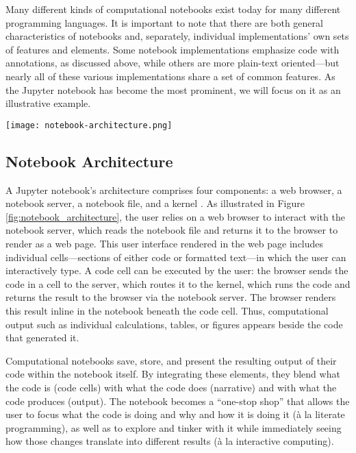 \documentclass[11pt,letterpaper]{article}
\begin{document}
Many different kinds of computational notebooks exist today for many different programming languages. It is important to note that there are both general characteristics of notebooks and, separately, individual implementations' own sets of features and elements. Some notebook implementations emphasize code with annotations, as discussed above, while others are more plain-text oriented---but nearly all of these various implementations share a set of common features. As the Jupyter notebook has become the most prominent, we will focus on it as an illustrative example.

\begin{figure*}[tbp]
	\centering
	\texttt{[image: notebook-architecture.png]}
	\caption{Architecture of the Jupyter notebook computing environment.}
	\label{fig:notebook_architecture}
\end{figure*}

\subsection{Notebook Architecture}

A Jupyter notebook's architecture comprises four components: a web browser, a notebook server, a notebook file, and a kernel \citep{kluyver_jupyter_2016}. As illustrated in Figure \ref{fig:notebook_architecture}, the user relies on a web browser to interact with the notebook server, which reads the notebook file and returns it to the browser to render as a web page. This user interface rendered in the web page includes individual cells---sections of either code or formatted text---in which the user can interactively type. A code cell can be executed by the user: the browser sends the code in a cell to the server, which routes it to the kernel, which runs the code and returns the result to the browser via the notebook server. The browser renders this result inline in the notebook beneath the code cell. Thus, computational output such as individual calculations, tables, or figures appears beside the code that generated it.

Computational notebooks save, store, and present the resulting output of their code within the notebook itself. By integrating these elements, they blend what the code is (code cells) with what the code does (narrative) and with what the code produces (output). The notebook becomes a \enquote{one-stop shop} that allows the user to focus what the code is doing and why and how it is doing it (à la literate programming), as well as to explore and tinker with it while immediately seeing how those changes translate into different results (à la interactive computing).
\end{document}
